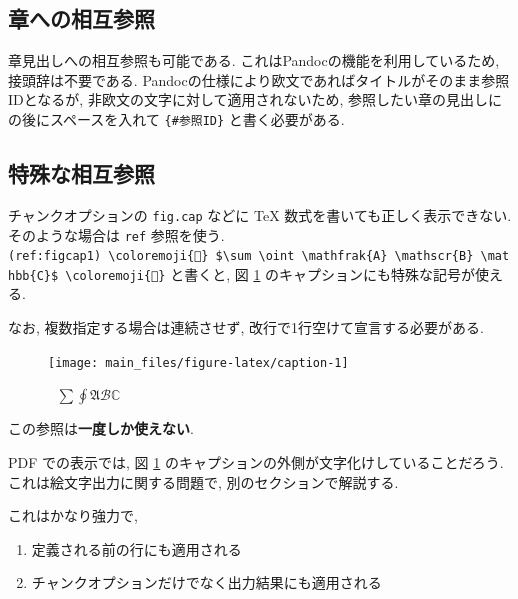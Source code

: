 \documentclass[
  nomag]{bxjsbook}
\providecommand{\tightlist}{%
  \setlength{\itemsep}{0pt}\setlength{\parskip}{0pt}}
\theoremstyle{definition}
\theoremstyle{definition}
\theoremstyle{definition}
\theoremstyle{remark}
\begin{document}
\hypertarget{ux7ae0ux3078ux306eux76f8ux4e92ux53c2ux7167}{%
\subsection{章への相互参照}\label{ux7ae0ux3078ux306eux76f8ux4e92ux53c2ux7167}}

章見出しへの相互参照も可能である. これはPandocの機能を利用しているため,
接頭辞は不要である.
Pandocの仕様により欧文であればタイトルがそのまま参照IDとなるが,
非欧文の文字に対して適用されないため,
参照したい章の見出しにの後にスペースを入れて \texttt{\{\#参照ID\}}
と書く必要がある.

\hypertarget{ux7279ux6b8aux306aux76f8ux4e92ux53c2ux7167}{%
\subsection{特殊な相互参照}\label{ux7279ux6b8aux306aux76f8ux4e92ux53c2ux7167}}

チャンクオプションの \texttt{fig.cap} などに TeX
数式を書いても正しく表示できない. そのような場合は \texttt{ref}
参照を使う.
\texttt{(ref:figcap1)\ \textbackslash{}coloremoji\{🌸\}\ \$\textbackslash{}sum\ \textbackslash{}oint\ \textbackslash{}mathfrak\{A\}\ \textbackslash{}mathscr\{B\}\ \textbackslash{}mathbb\{C\}\$\ \textbackslash{}coloremoji\{🌸\}}
と書くと, 図 \ref{fig:caption} のキャプションにも特殊な記号が使える.




なお, 複数指定する場合は連続させず, 改行で1行空けて宣言する必要がある.

\begin{figure}

{\centering \texttt{[image: main\_files/figure-latex/caption-1]} 

}

\caption{🌸
\(\sum \oint \mathfrak{A} \mathscr{B} \mathbb{C}\) 🌸}\label{fig:caption}
\end{figure}

この参照は\textbf{一度しか使えない}.

PDF での表示では, 図 \ref{fig:caption}
のキャプションの外側が文字化けしていることだろう.
これは絵文字出力に関する問題で, 別のセクションで解説する.

これはかなり強力で,

\begin{enumerate}
\def\labelenumi{\arabic{enumi}.}
\tightlist
\item
  定義される前の行にも適用される
\item
  チャンクオプションだけでなく出力結果にも適用される
\end{enumerate}
\end{document}
